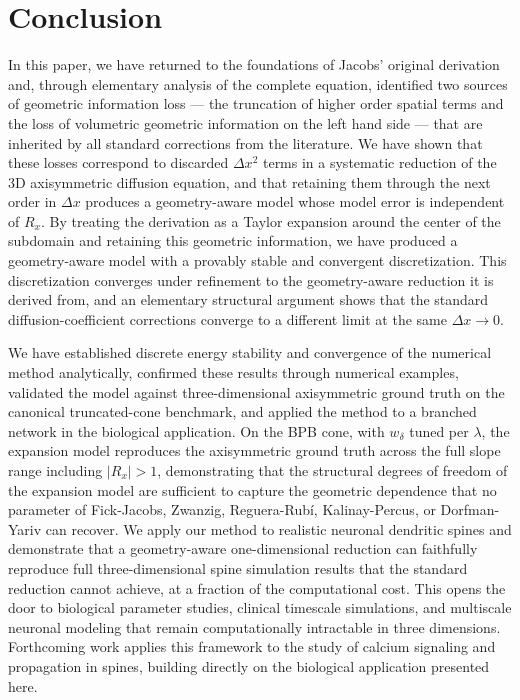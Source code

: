 \documentclass[11pt]{article}
\begin{document}


\section{Conclusion}

In this paper, we have returned to the foundations of Jacobs' original derivation and, through elementary analysis of the complete equation, identified two sources of geometric information loss — the truncation of higher order spatial terms and the loss of volumetric geometric information on the left hand side — that are inherited by all standard corrections from the literature. We have shown that these losses correspond to discarded $\Delta x^2$ terms in a systematic reduction of the 3D axisymmetric diffusion equation, and that retaining them through the next order in $\Delta x$ produces a geometry-aware model whose model error is independent of $R_x$. By treating the derivation as a Taylor expansion around the center of the subdomain and retaining this geometric information, we have produced a geometry-aware model with a provably stable and convergent discretization. This discretization converges under refinement to the geometry-aware reduction it is derived from, and an elementary structural argument shows that the standard diffusion-coefficient corrections converge to a different limit at the same $\Delta x \to 0$.

We have established discrete energy stability and convergence of the numerical method analytically, confirmed these results through numerical examples, validated the model against three-dimensional axisymmetric ground truth on the canonical truncated-cone benchmark, and applied the method to a branched network in the biological application. On the BPB cone, with $w_\delta$ tuned per $\lambda$, the expansion model reproduces the axisymmetric ground truth across the full slope range including $|R_x| > 1$, demonstrating that the structural degrees of freedom of the expansion model are sufficient to capture the geometric dependence that no parameter of Fick-Jacobs, Zwanzig, Reguera-Rub\'{i}, Kalinay-Percus, or Dorfman-Yariv can recover. We apply our method to realistic neuronal dendritic spines and demonstrate that a geometry-aware one-dimensional reduction can faithfully reproduce full three-dimensional spine simulation results that the standard reduction cannot achieve, at a fraction of the computational cost. This opens the door to biological parameter studies, clinical timescale simulations, and multiscale neuronal modeling that remain computationally intractable in three dimensions. Forthcoming work applies this framework to the study of calcium signaling and propagation in spines, building directly on the biological application presented here.
\end{document}
